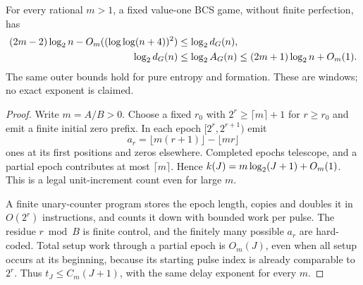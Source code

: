 \begin{theorem}\label{thm:windows}
For every rational $m>1$, a fixed value-one BCS game, without finite perfection, has
\begin{align*}
 (2m-2)\log_2 n-O_m((\log\log(n+4))^2)
 &\le\log_2 d_G(n),\\
 \log_2 d_G(n)&\le\log_2 A_G(n)
 \le(2m+1)\log_2 n+O_m(1).
\end{align*}
The same outer bounds hold for pure entropy and formation. These are windows; no exact exponent is claimed.
\end{theorem}
\begin{proof}
Write $m=A/B>0$. Choose a fixed $r_0$ with $2^r\ge\lceil m\rceil+1$ for $r\ge r_0$ and emit a finite initial zero prefix. In each epoch $[2^r,2^{r+1})$ emit
\[
 a_r=\lfloor m(r+1)\rfloor-\lfloor mr\rfloor
\]
ones at its first positions and zeros elsewhere. Completed epochs telescope, and a partial epoch contributes at most $\lceil m\rceil$. Hence $k(J)=m\log_2(J+1)+O_m(1)$. This is a legal unit-increment count even for large $m$.

A finite unary-counter program stores the epoch length, copies and doubles it in $O(2^r)$ instructions, and counts it down with bounded work per pulse. The residue $r\bmod B$ is finite control, and the finitely many possible $a_r$ are hard-coded. Total setup work through a partial epoch is $O_m(J)$, even when all setup occurs at its beginning, because its starting pulse index is already comparable to $2^r$. Thus $t_J\le C_m(J+1)$, with the same delay exponent for every $m$.


\end{proof}
